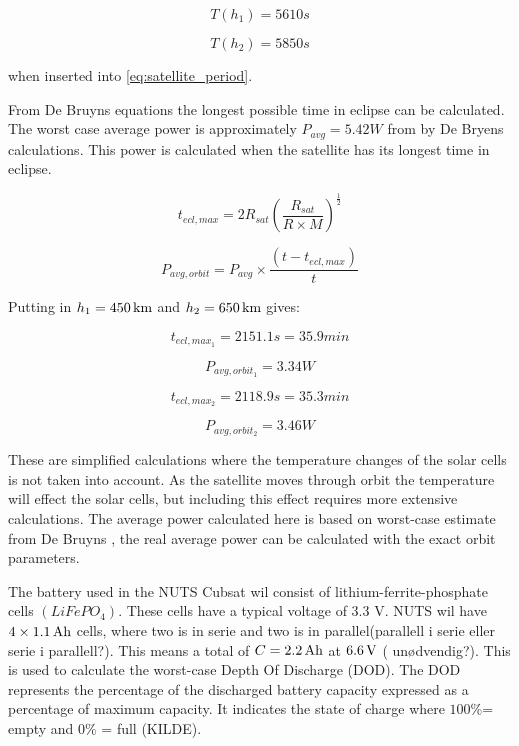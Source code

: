 \begin{equation}
T(h_1) = 5610s
\end{equation}

\begin{equation}
T(h_2) = 5850s
\end{equation}

when inserted into \autoref{eq:satellite_period}.

From De Bruyns equations \cite{Satellite Power Systems} the longest possible time in eclipse can be calculated. The worst case average power is approximately $P_{avg} = 5.42 W$ from by De Bryens calculations. This power is calculated when the satellite has its longest time in eclipse.

\begin{equation}
	t_{ecl,max} = 2R_{sat}\left(\frac{R_{sat}}{R\times M}\right)^{\frac{1}{2}}
	\label{Maximum time in eclipse}
\end{equation}

\begin{equation}
	P_{avg,orbit} = P_{avg}\times\frac{(t-t_{ecl,max})}{t}
	\label{Average effect during one orbit}
\end{equation}

Putting in $h_1 =\unit[450]{km}$ and $h_2 = \unit[650]{km}$ gives:

\begin{equation}
t_{ecl,max_1} = 2151.1 s = 35.9 min
\end{equation}

\begin{equation}
P_{avg,orbit_1} = 3.34W
\end{equation}

\begin{equation}
t_{ecl,max_2} = 2118.9 s = 35.3 min
\end{equation}

\begin{equation}
P_{avg,orbit_2} = 3.46W
\end{equation}

These are simplified calculations where the temperature changes of the solar cells is not taken into account. As the satellite moves through orbit the temperature will effect the solar cells, but including this effect requires more extensive calculations. The average power calculated here is based on worst-case estimate from De Bruyns \cite{Satellite Power Systems}, the real average power can be calculated with the exact orbit parameters. 

The battery used in the NUTS Cubsat wil consist of lithium-ferrite-phosphate cells $(LiFePO_4)$\cite{Overview of NUTS}. 
These cells have a typical voltage of 3.3 V. NUTS wil have $4\times \unit[1.1]{Ah}$ cells, where two is in serie and two is in parallel(parallell i serie eller serie i parallell?). This means a total of $C=\unit[2.2]{Ah}$ at $\unit[6.6]{V}$ (\cite{Satellite Power Systems} unødvendig?). This is used to calculate the worst-case Depth Of Discharge (DOD). The DOD represents the percentage of the discharged battery capacity expressed as a percentage of maximum capacity. It indicates the state of charge where $100\% $= empty and  $0\%$ = full (KILDE).

